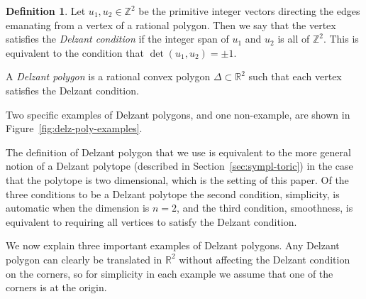 \documentclass[10pt,a4paper]{amsart}
\numberwithin{equation}{section}
\def\R{{\mathbb R}}
\def\Z{{\mathbb Z}}
\newcommand{\De}{\Delta}
\theoremstyle{definition}
\newtheorem{definition}[Theorem]{Definition}
\theoremstyle{plain}
\theoremstyle{plain}
\begin{document}
\begin{definition}\label{def:delzant_cond}
Let $u_1,u_2\in\mathbb{Z}^2$ be the primitive integer vectors directing the edges emanating from a vertex of a rational polygon. Then we say that the vertex satisfies the \emph{Delzant condition} if the integer span of $u_1$ and $u_2$ is all of $\Z^2$. This is equivalent to the condition that ${\det (u_1,u_2) = \pm 1}$.
\end{definition}

\begin{Definition}\label{def:delzant} A \emph{Delzant polygon} is a rational convex polygon $\De\subset\R^2$ such that each vertex satisfies the Delzant condition.
\end{Definition}

Two specific examples of Delzant polygons, and one non-example, are shown in Figure~\ref{fig:delz-poly-examples}.


\begin{Remark}
The definition of Delzant polygon that we use is equivalent to the more general notion of a Delzant polytope (described in Section~\ref{sec:sympl-toric}) in the case that the polytope is two dimensional, which is the setting of this paper.
Of the three conditions to be a Delzant polytope the second condition, simplicity, is automatic when the dimension is $n=2$, and the third condition, smoothness, is equivalent to requiring all vertices to satisfy the Delzant condition.
\end{Remark}













We now explain three important examples of Delzant polygons. Any Delzant polygon can clearly be translated in $\R^2$ without affecting the Delzant condition on the corners, so for simplicity in each example we assume that one of the corners is at the origin.
\end{document}

